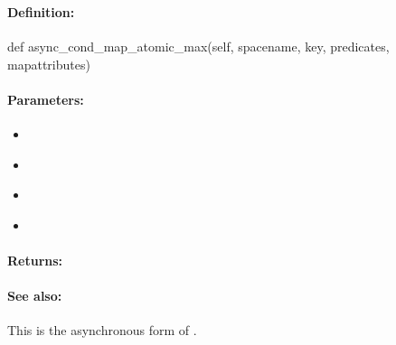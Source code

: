 \pagebreak
\subsubsection{}
\label{api:python:async_cond_map_atomic_max}


\paragraph{Definition:}
\begin{pythoncode}
def async_cond_map_atomic_max(self, spacename, key, predicates, mapattributes)
\end{pythoncode}

\paragraph{Parameters:}
\begin{itemize}[noitemsep]
\item {}\\

\item {}\\

\item {}\\

\item {}\\

\end{itemize}

\paragraph{Returns:}


\paragraph{See also:}  This is the asynchronous form of .

\pagebreak
\subsubsection{}
\label{api:python:group_map_atomic_max}


